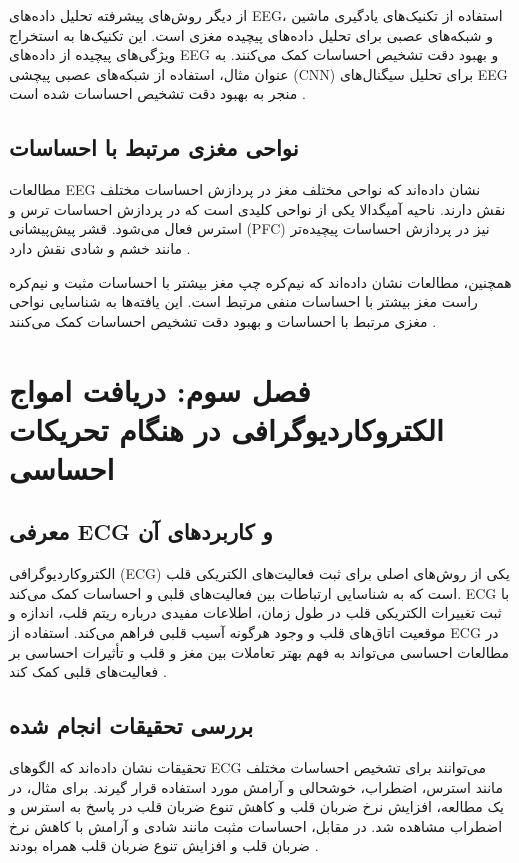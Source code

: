 \documentclass[12pt]{article}
\begin{document}
از دیگر روش‌های پیشرفته تحلیل داده‌های EEG، استفاده از تکنیک‌های یادگیری ماشین و شبکه‌های عصبی برای تحلیل داده‌های پیچیده مغزی است. این تکنیک‌ها به استخراج ویژگی‌های پیچیده از داده‌های EEG و بهبود دقت تشخیص احساسات کمک می‌کنند. به عنوان مثال، استفاده از شبکه‌های عصبی پیچشی (CNN) برای تحلیل سیگنال‌های EEG منجر به بهبود دقت تشخیص احساسات شده است \cite{He2020}.

\subsection{نواحی مغزی مرتبط با احساسات}

مطالعات EEG نشان داده‌اند که نواحی مختلف مغز در پردازش احساسات مختلف نقش دارند. ناحیه آمیگدالا یکی از نواحی کلیدی است که در پردازش احساسات ترس و استرس فعال می‌شود. قشر پیش‌پیشانی (PFC) نیز در پردازش احساسات پیچیده‌تر مانند خشم و شادی نقش دارد \cite{Zhao2021}.

همچنین، مطالعات نشان داده‌اند که نیم‌کره چپ مغز بیشتر با احساسات مثبت و نیم‌کره راست مغز بیشتر با احساسات منفی مرتبط است. این یافته‌ها به شناسایی نواحی مغزی مرتبط با احساسات و بهبود دقت تشخیص احساسات کمک می‌کنند \cite{Zhao2021}.

\section{فصل سوم: دریافت امواج الکتروکاردیوگرافی در هنگام تحریکات احساسی}

\subsection{معرفی ECG و کاربردهای آن}

الکتروکاردیوگرافی (ECG) یکی از روش‌های اصلی برای ثبت فعالیت‌های الکتریکی قلب است که به شناسایی ارتباطات بین فعالیت‌های قلبی و احساسات کمک می‌کند. ECG با ثبت تغییرات الکتریکی قلب در طول زمان، اطلاعات مفیدی درباره ریتم قلب، اندازه و موقعیت اتاق‌های قلب و وجود هرگونه آسیب قلبی فراهم می‌کند. استفاده از ECG در مطالعات احساسی می‌تواند به فهم بهتر تعاملات بین مغز و قلب و تأثیرات احساسی بر فعالیت‌های قلبی کمک کند \cite{Shu2018}.

\subsection{بررسی تحقیقات انجام شده}

تحقیقات نشان داده‌اند که الگوهای ECG می‌توانند برای تشخیص احساسات مختلف مانند استرس، اضطراب، خوشحالی و آرامش مورد استفاده قرار گیرند. برای مثال، در یک مطالعه، افزایش نرخ ضربان قلب و کاهش تنوع ضربان قلب در پاسخ به استرس و اضطراب مشاهده شد. در مقابل، احساسات مثبت مانند شادی و آرامش با کاهش نرخ ضربان قلب و افزایش تنوع ضربان قلب همراه بودند \cite{Shu2018}.
\end{document}
